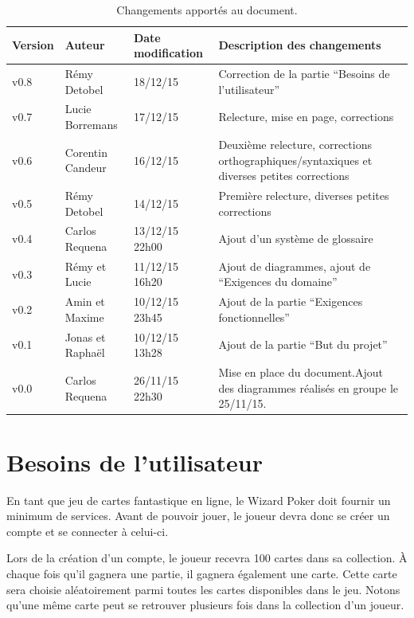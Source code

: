 \documentclass[11pt,a4paper]{article}
\begin{document}
\begin{table}[h]
  \centering
  \begin{tabular}[ht]{|l|l|l|p{18em}|}
    \hline

    \textbf{Version}
    & \textbf{Auteur}
    & \textbf{Date modification}
    & \textbf{Description des changements}\\ \hline \hline
    v0.8 & Rémy Detobel & 18/12/15 & Correction de la partie ``Besoins de l'utilisateur'' \\ \hline
    v0.7 & Lucie Borremans & 17/12/15 & Relecture, mise en page, corrections \\ \hline
     v0.6 & Corentin Candeur & 16/12/15 & Deuxième relecture, corrections orthographiques/syntaxiques et diverses petites corrections \\ \hline
    v0.5 & Rémy Detobel & 14/12/15 & Première relecture, diverses petites corrections \\ \hline
    v0.4 & Carlos Requena  & 13/12/15 22h00 & Ajout d'un système de glossaire \\ \hline
    v0.3 & Rémy et Lucie  & 11/12/15 16h20 & Ajout de diagrammes, ajout de ``Exigences du domaine'' \\ \hline
    v0.2 & Amin et Maxime & 10/12/15 23h45 & Ajout de la partie ``Exigences fonctionnelles''\\ \hline
    v0.1 & Jonas et Raphaël & 10/12/15 13h28 & Ajout de la partie ``But du projet''\\ \hline
    v0.0 & Carlos Requena & 26/11/15 22h30 & Mise en place du document.Ajout des diagrammes réalisés en groupe le 25/11/15.\\ \hline
  \end{tabular}
  \caption{Changements apportés au document.}
  \label{tab:hist}
\end{table}


\glsaddall
\printnoidxglossaries


\section{Besoins de l'utilisateur}
\label{sec:besoins}

En tant que jeu de cartes fantastique en ligne, le Wizard Poker doit fournir un minimum de services. Avant de pouvoir jouer, le joueur devra donc se créer un compte et se connecter à celui-ci.  

\medbreak

Lors de la création d'un compte, le joueur recevra 100 cartes dans sa \gls{collection}.  À chaque fois qu'il gagnera une partie, il gagnera également une carte.  Cette carte sera choisie aléatoirement parmi toutes les cartes disponibles dans le jeu.  Notons qu'une même carte peut se retrouver plusieurs fois dans la \gls{collection} d'un joueur.  
\end{document}
